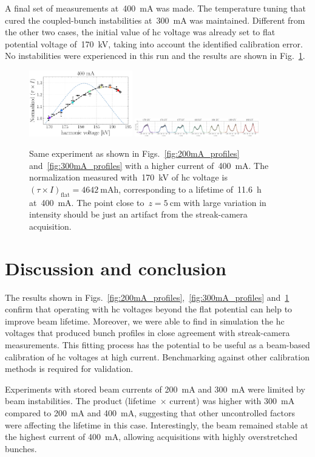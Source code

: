 \documentclass[a4paper,
               ]{jacow}
\begin{document}
A final set of measurements at~\SI{400}{\milli\ampere} was made. The temperature tuning that cured the coupled-bunch instabilities at~\SI{300}{\milli\ampere} was maintained. Different from the other two cases, the initial value of \gls{hc} voltage was already set to flat potential voltage of~\SI{170}{\kilo\volt}, taking into account the identified calibration error. No instabilities were experienced in this run and the results are shown in Fig.~\ref{fig:400mA_profiles}.
\begin{figure}
    \centering
    \includegraphics[width=0.4\textwidth]{WEPR42_f6a.pdf}
    \includegraphics[width=0.48\textwidth]{WEPR42_f6b.pdf}
    \caption{Same experiment as shown in Figs.~\ref{fig:200mA_profiles} and~\ref{fig:300mA_profiles} with a higher current of~\SI{400}{\milli\ampere}. The normalization measured with~\SI{170}{\kilo\volt} of \gls{hc} voltage is~$(\tau \times I)_\text{flat} = \SI{4642}{\milli\ampere\hour}$, corresponding to a lifetime of~\SI{11.6}{\hour} at~\SI{400}{\milli\ampere}. The point close to~$z=\SI{5}{\centi\meter}$ with large variation in intensity should be just an artifact from the streak-camera acquisition.}
    \label{fig:400mA_profiles}
\end{figure}
\section{Discussion and conclusion}
The results shown in Figs.~\ref{fig:200mA_profiles},~\ref{fig:300mA_profiles} and~\ref{fig:400mA_profiles} confirm that operating with \gls{hc} voltages beyond the flat potential can help to improve beam lifetime. Moreover, we were able to find in simulation the \gls{hc} voltages that produced bunch profiles in close agreement with streak-camera measurements. This fitting process has the potential to be useful as a beam-based calibration of \gls{hc} voltages at high current. Benchmarking against other calibration methods is required for validation.

Experiments with stored beam currents of \SI{200}{\milli\ampere} and \SI{300}{\milli\ampere} were limited by beam instabilities. The product (lifetime~$\times$ current) was higher with \SI{300}{\milli\ampere} compared to \SI{200}{\milli\ampere} and \SI{400}{\milli\ampere}, suggesting that other uncontrolled factors were affecting the lifetime in this case. Interestingly, the beam remained stable at the highest current of \SI{400}{\milli\ampere}, allowing acquisitions with highly overstretched bunches.
\end{document}
